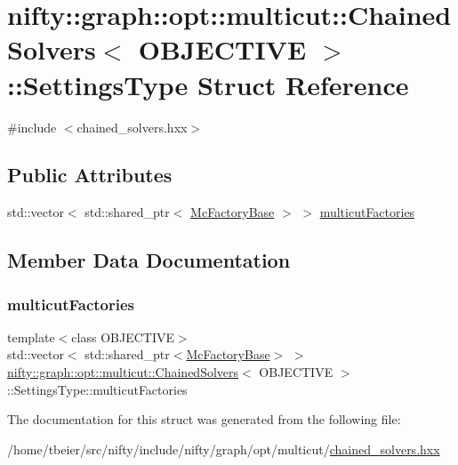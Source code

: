 \hypertarget{structnifty_1_1graph_1_1opt_1_1multicut_1_1ChainedSolvers_1_1SettingsType}{}\section{nifty\+:\+:graph\+:\+:opt\+:\+:multicut\+:\+:Chained\+Solvers$<$ O\+B\+J\+E\+C\+T\+I\+VE $>$\+:\+:Settings\+Type Struct Reference}
\label{structnifty_1_1graph_1_1opt_1_1multicut_1_1ChainedSolvers_1_1SettingsType}


{\ttfamily \#include $<$chained\+\_\+solvers.\+hxx$>$}

\subsection*{Public Attributes}
\begin{DoxyCompactItemize}
\item 
std\+::vector$<$ std\+::shared\+\_\+ptr$<$ \hyperlink{classnifty_1_1graph_1_1opt_1_1multicut_1_1ChainedSolvers_acb272f072d6f09a3a6f136fe2ee31068}{Mc\+Factory\+Base} $>$ $>$ \hyperlink{structnifty_1_1graph_1_1opt_1_1multicut_1_1ChainedSolvers_1_1SettingsType_aaab434c622a8b6af626266d082aba087}{multicut\+Factories}
\end{DoxyCompactItemize}


\subsection{Member Data Documentation}
\mbox{\label{structnifty_1_1graph_1_1opt_1_1multicut_1_1ChainedSolvers_1_1SettingsType_aaab434c622a8b6af626266d082aba087}} 
\subsubsection{\texorpdfstring{multicut\+Factories}{multicutFactories}}
{\footnotesize\ttfamily template$<$class O\+B\+J\+E\+C\+T\+I\+VE$>$ \\
std\+::vector$<$ std\+::shared\+\_\+ptr$<$\hyperlink{classnifty_1_1graph_1_1opt_1_1multicut_1_1ChainedSolvers_acb272f072d6f09a3a6f136fe2ee31068}{Mc\+Factory\+Base}$>$ $>$ \hyperlink{classnifty_1_1graph_1_1opt_1_1multicut_1_1ChainedSolvers}{nifty\+::graph\+::opt\+::multicut\+::\+Chained\+Solvers}$<$ O\+B\+J\+E\+C\+T\+I\+VE $>$\+::Settings\+Type\+::multicut\+Factories}



The documentation for this struct was generated from the following file\+:\begin{DoxyCompactItemize}
\item 
/home/tbeier/src/nifty/include/nifty/graph/opt/multicut/\hyperlink{multicut_2chained__solvers_8hxx}{chained\+\_\+solvers.\+hxx}\end{DoxyCompactItemize}

